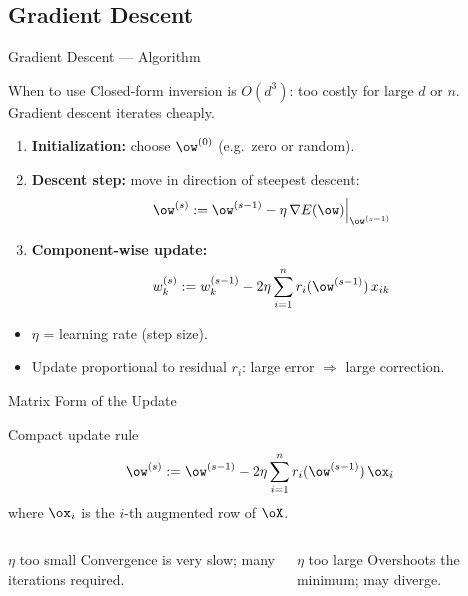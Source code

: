 \subsection{Gradient Descent}

\begin{frame}{Gradient Descent — Algorithm}
  \begin{block}{When to use}
    Closed-form inversion is $O(d^3)$: too costly for large $d$ or $n$.
    Gradient descent iterates cheaply.
  \end{block}
  \vspace{.3em}
  \begin{enumerate}
    \item \textbf{Initialization:} choose $\ow^{(0)}$ (e.g.\ zero or random).
    \item \textbf{Descent step:} move in direction of \alert{steepest descent}:
    \[
      \ow^{(s)} := \ow^{(s-1)} - \eta\,\nabla E(\ow)\Big|_{\ow^{(s-1)}}
    \]
    \item \textbf{Component-wise update:}
    \[
      w_k^{(s)} := w_k^{(s-1)} - 2\eta\sum_{i=1}^n r_i(\ow^{(s-1)})\,x_{ik}
    \]
  \end{enumerate}
  \begin{itemize}
    \item $\eta$ = \alert{learning rate} (step size).
    \item Update proportional to residual $r_i$: large error $\Rightarrow$ large correction.
  \end{itemize}
\end{frame}

\begin{frame}{Matrix Form of the Update}
  \begin{block}{Compact update rule}
    \[
      \ow^{(s)} := \ow^{(s-1)} - 2\eta\sum_{i=1}^n r_i(\ow^{(s-1)})\,\ox_i
    \]
    where $\ox_i$ is the $i$-th augmented row of $\oX$.
  \end{block}
  \vspace{.4em}
  \begin{columns}[T]
    \begin{alertblock}{$\eta$ too small}
      Convergence is very slow; many iterations required.
    \end{alertblock}
    \begin{alertblock}{$\eta$ too large}
      Overshoots the minimum; may diverge.
    \end{alertblock}
  \end{columns}
\end{frame}

